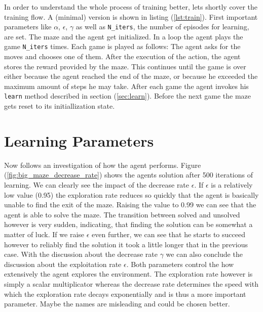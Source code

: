 \documentclass[12pt,a4paper]{scrartcl}
\begin{document}
In order to understand the whole process of training better, lets shortly cover
the training flow. A (minimal) version is shown in listing (\ref{lst:train}).
First important parameters like $\alpha$, $\epsilon$, $\gamma$ as well as 
\texttt{N\_iters}, the number of episodes for learning, are set. The maze and
the agent get initialized. In a loop the agent plays the game \texttt{N\_iters}
times. Each game is played as follows: The agent asks for the moves and chooses
one of them. After the execution of the action, the agent stores the reward
provided by the maze. This continues until the game is over either because the
agent reached the end of the maze, or because he exceeded the maximum amount of
steps he may take. After each game the agent invokes his \texttt{learn} method
described in section (\ref{sec:learn}). Before the next game the maze gets
reset to its initiallization state.



\section{Learning Parameters}
\label{seq:parameters}

Now follows an investigation of how the agent performs. Figure 
(\ref{fig:big_maze_decrease_rate}) shows the agents solution after 500
iterations of learning. We can clearly see the impact of the decrease rate
$\epsilon$. If $\epsilon$ is a relatively low value (0.95) the exploration rate
reduces so quickly that the agent is basically unable to find the exit of the
maze. Raising the value to 0.99 we can see that the agent is able to
solve the maze. The transition between solved and unsolved however is very
sudden, indicating, that finding the solution can be somewhat a matter of luck.
If we raise $\epsilon$ even further, we can see that he starts to succeed
however to reliably find the solution it took a little longer that in the
previous case.
With the discussion about the decrease rate $\gamma$ we can also conclude the
discussion about the exploitation rate $\epsilon$. Both parameters control the 
how extensively the agent explores the environment. The exploration rate however
is simply a scalar multiplicator whereas the decrease rate determines the speed
with which the exploration rate decays exponentially and is thus a more
important parameter. Maybe the names are misleading and could be chosen better.
\end{document}

